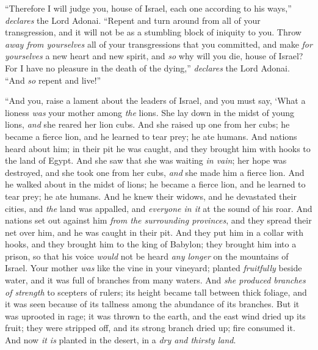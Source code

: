 \begin{biblechapter}
\verse “Therefore I will judge you, house of Israel, each one according to his ways,” \textit{declares} the Lord Adonai. “Repent and turn around from all of your transgression, and it will not be as a stumbling block of iniquity to you.
\verse Throw \textit{away from yourselves} all of your transgressions that you committed, and make \textit{for yourselves} a new heart and new spirit, and \textit{so} why will you die, house of Israel?
\verse For I have no pleasure in the death of the dying,” \textit{declares} the Lord Adonai. “And \textit{so} repent and live!”
\end{biblechapter}

\begin{biblechapter} %
 “And you, raise a lament about the leaders of Israel,
\verse and you must say,
\verse ‘What a lioness \textit{was} your mother 
among \textit{the} lions. 
She lay down in the midst of young lions, 
\textit{and} she reared her lion cubs.
\verse And she raised up one from her cubs; 
he became a fierce lion, 
and he learned to tear prey; 
he ate humans.
\verse And nations heard about him; 
in their pit he was caught, 
and they brought him with hooks 
to the land of Egypt.
\verse And she saw that she was waiting \textit{in vain}; 
her hope was destroyed, 
and she took one from her cubs, 
\textit{and} she made him a fierce lion.
\verse And he walked about in the midst of lions; 
he became a fierce lion, 
and he learned to tear prey; 
he ate humans.
\verse And he knew their widows, 
and he devastated their cities, 
and \textit{the} land was appalled, and \textit{everyone in it} 
at the sound of his roar.
\verse And nations set out against him 
\textit{from the surrounding provinces}, 
and they spread their net over him, 
and he was caught in their pit.
\verse And they put him in a collar with hooks, 
and they brought him to the king of Babylon; 
they brought him into a prison, 
so that his voice \textit{would} not be heard \textit{any longer} 
on the mountains of Israel.
\verse Your mother \textit{was} like the vine in your vineyard; 
planted \textit{fruitfully} beside water, 
and it was full of branches 
from many waters.
\verse And \textit{she produced branches of strength} 
to scepters of rulers; 
its height became tall 
between thick foliage, 
and it was seen because of its tallness 
among the abundance of its branches.
\verse But it was uprooted in rage; 
it was thrown to the earth, 
and the east wind dried up its fruit; 
they were stripped off, 
and its strong branch dried up; 
fire consumed it.
\verse And now \textit{it is} planted in the desert, 
in a \textit{dry and thirsty land}.
\end{biblechapter}

